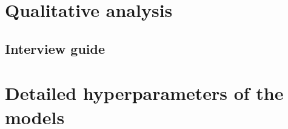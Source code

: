 









\chapter{Qualitative analysis}
\label{app:Qualitative-analysis}

\section{Interview guide}
\label{sec:Interview-Guide}



\chapter{Detailed hyperparameters of the models}
\label{app:detailed-hyperparameters}

